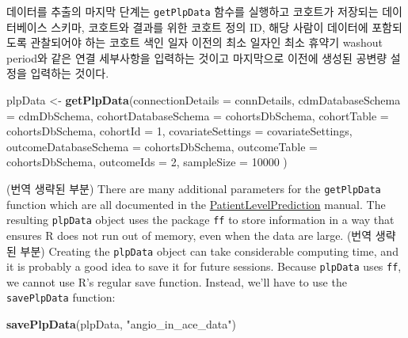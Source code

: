 \documentclass[10.5pt]{book}
\newenvironment{Shaded}{\begin{snugshade}}{\end{snugshade}}
\newcommand{\KeywordTok}[1]{\textcolor[rgb]{0.13,0.29,0.53}{\textbf{#1}}}
\newcommand{\DataTypeTok}[1]{\textcolor[rgb]{0.13,0.29,0.53}{#1}}
\newcommand{\DecValTok}[1]{\textcolor[rgb]{0.00,0.00,0.81}{#1}}
\newcommand{\StringTok}[1]{\textcolor[rgb]{0.31,0.60,0.02}{#1}}
\newcommand{\NormalTok}[1]{#1}
\theoremstyle{definition}
\theoremstyle{definition}
\theoremstyle{definition}
\theoremstyle{remark}
\begin{document}
데이터를 추출의 마지막 단계는 \texttt{getPlpData} 함수를 실행하고
코호트가 저장되는 데이터베이스 스키마, 코호트와 결과를 위한 코호트 정의
ID, 해당 사람이 데이터에 포함되도록 관찰되어야 하는 코호트 색인 일자
이전의 최소 일자인 최소 휴약기 washout period와 같은 연결 세부사항을
입력하는 것이고 마지막으로 이전에 생성된 공변량 설정을 입력하는 것이다.

\begin{Shaded}
\begin{Highlighting}[]
\NormalTok{plpData <-}\StringTok{ }\KeywordTok{getPlpData}\NormalTok{(}\DataTypeTok{connectionDetails =}\NormalTok{ connDetails,}
                      \DataTypeTok{cdmDatabaseSchema =}\NormalTok{ cdmDbSchema,}
                      \DataTypeTok{cohortDatabaseSchema =}\NormalTok{ cohortsDbSchema,}
                      \DataTypeTok{cohortTable =}\NormalTok{ cohortsDbSchema,}
                      \DataTypeTok{cohortId =} \DecValTok{1}\NormalTok{,}
                      \DataTypeTok{covariateSettings =}\NormalTok{ covariateSettings,}
                      \DataTypeTok{outcomeDatabaseSchema =}\NormalTok{ cohortsDbSchema,}
                      \DataTypeTok{outcomeTable =}\NormalTok{ cohortsDbSchema,}
                      \DataTypeTok{outcomeIds =} \DecValTok{2}\NormalTok{,}
                      \DataTypeTok{sampleSize =} \DecValTok{10000}
\NormalTok{)}
\end{Highlighting}
\end{Shaded}

(번역 생략된 부분) There are many additional parameters for the
\texttt{getPlpData} function which are all documented in the
\href{https://ohdsi.github.io/PatientLevelPrediction/}{PatientLevelPrediction}
manual. The resulting \texttt{plpData} object uses the package
\texttt{ff} to store information in a way that ensures R does not run
out of memory, even when the data are large. (번역 생략된 부분) Creating
the \texttt{plpData} object can take considerable computing time, and it
is probably a good idea to save it for future sessions. Because
\texttt{plpData} uses \texttt{ff}, we cannot use R's regular save
function. Instead, we'll have to use the \texttt{savePlpData} function:

\begin{Shaded}
\begin{Highlighting}[]
\KeywordTok{savePlpData}\NormalTok{(plpData, }\StringTok{"angio_in_ace_data"}\NormalTok{)}
\end{Highlighting}
\end{Shaded}
\end{document}
